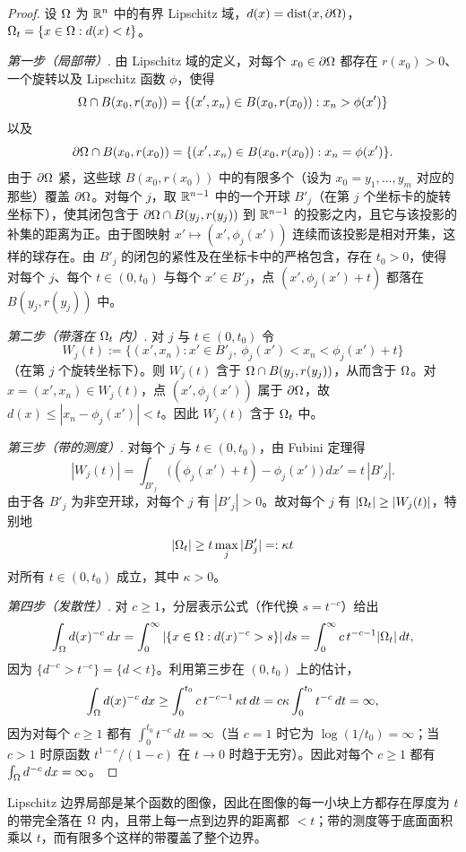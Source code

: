 \begin{proof}
设 $\Omega$ 为 $\mathbb{R}^n$ 中的有界 Lipschitz 域，$d(x)=\operatorname{dist}(x,\partial\Omega)$，$\Omega_{t}=\{x\in\Omega : d(x)<t\}$。

\emph{第一步（局部带）}. 由 Lipschitz 域的定义，对每个 $x_0\in\partial\Omega$ 都存在 $r(x_0)>0$、一个旋转以及 Lipschitz 函数 $\phi$，使得
\[
  \Omega\cap B(x_0,r(x_0))=\{(x',x_n)\in B(x_0,r(x_0)) : x_n>\phi(x')\}
\]
以及
\[
  \partial\Omega\cap B(x_0,r(x_0))=\{(x',x_n)\in B(x_0,r(x_0)) : x_n=\phi(x')\} .
\]
由于 $\partial\Omega$ 紧，这些球 $B(x_0,r(x_0))$ 中的有限多个（设为 $x_0=y_1,\dots,y_m$ 对应的那些）覆盖 $\partial\Omega$。对每个 $j$，取 $\mathbb{R}^{n-1}$ 中的一个开球 $B'_j$（在第 $j$ 个坐标卡的旋转坐标下），使其闭包含于 $\partial\Omega\cap B(y_j,r(y_j))$ 到 $\mathbb{R}^{n-1}$ 的投影之内，且它与该投影的补集的距离为正。由于图映射 $x'\mapsto(x',\phi_j(x'))$ 连续而该投影是相对开集，这样的球存在。由 $B'_j$ 的闭包的紧性及在坐标卡中的严格包含，存在 $t_0>0$，使得对每个 $j$、每个 $t\in(0,t_0)$ 与每个 $x'\in B'_j$，点 $(x',\phi_j(x')+t)$ 都落在 $B(y_j,r(y_j))$ 中。

\emph{第二步（带落在 $\Omega_{t}$ 内）}. 对 $j$ 与 $t\in(0,t_0)$ 令
\[
  W_j(t):=\{(x',x_n) : x'\in B'_j,\ \phi_j(x')<x_n<\phi_j(x')+t\}
\]
（在第 $j$ 个旋转坐标下）。则 $W_j(t)$ 含于 $\Omega\cap B(y_j,r(y_j))$，从而含于 $\Omega$。对 $x=(x',x_n)\in W_j(t)$，点 $(x',\phi_j(x'))$ 属于 $\partial\Omega$，故 $d(x)\le|x_n-\phi_j(x')|<t$。因此 $W_j(t)$ 含于 $\Omega_{t}$ 中。

\emph{第三步（带的测度）}. 对每个 $j$ 与 $t\in(0,t_0)$，由 Fubini 定理得
\[
  |W_j(t)|=\int_{B'_j}\big((\phi_j(x')+t)-\phi_j(x')\big)\,dx'=t\,|B'_j| .
\]
由于各 $B'_j$ 为非空开球，对每个 $j$ 有 $|B'_j|>0$。故对每个 $j$ 有 $|\Omega_{t}|\ge|W_j(t)|$，特别地
\[
  |\Omega_{t}|\ge t\max_j|B'_j|=:\kappa t
\]
对所有 $t\in(0,t_0)$ 成立，其中 $\kappa>0$。

\emph{第四步（发散性）}. 对 $c\ge1$，分层表示公式（作代换 $s=t^{-c}$）给出
\[
  \int_\Omega d(x)^{-c}\,dx
  =\int_0^\infty |\{x\in\Omega : d(x)^{-c}>s\}|\,ds
  =\int_0^\infty c\,t^{-c-1}|\Omega_{t}|\,dt ,
\]
因为 $\{d^{-c}>t^{-c}\}=\{d<t\}$。利用第三步在 $(0,t_0)$ 上的估计，
\[
  \int_\Omega d(x)^{-c}\,dx
  \ge\int_0^{t_0} c\,t^{-c-1}\,\kappa t\,dt
  =c\kappa\int_0^{t_0} t^{-c}\,dt=\infty ,
\]
因为对每个 $c\ge1$ 都有 $\int_0^{t_0} t^{-c}\,dt=\infty$（当 $c=1$ 时它为 $\log(1/t_0)=\infty$；当 $c>1$ 时原函数 $t^{1-c}/(1-c)$ 在 $t\to0$ 时趋于无穷）。因此对每个 $c\ge1$ 都有 $\int_\Omega d^{-c}\,dx=\infty$。
\end{proof}

\begin{remark}[直觉]
Lipschitz 边界局部是某个函数的图像，因此在图像的每一小块上方都存在厚度为 $t$ 的带完全落在 $\Omega$ 内，且带上每一点到边界的距离都 $<t$；带的测度等于底面面积乘以 $t$，而有限多个这样的带覆盖了整个边界。
\end{remark}
